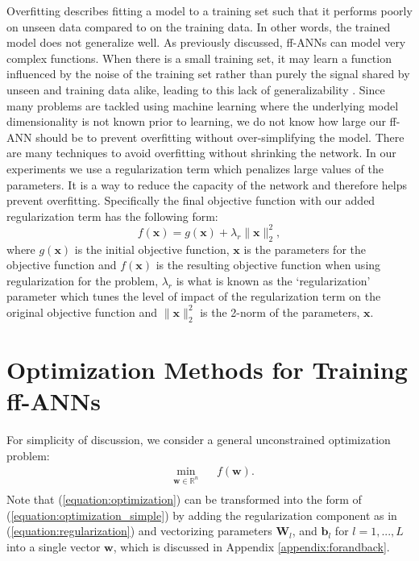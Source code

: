 \documentclass[letterpaper,12pt,titlepage,oneside,final]{book}
\begin{document}
	Overfitting describes fitting a model to a training set such that it performs poorly on unseen data compared to on the training data. In other words, the trained model does not generalize well. As previously discussed, ff-ANNs can model very complex functions. When there is a small training set, it may learn a function influenced by the noise of the training set rather than purely the signal shared by unseen and training data alike, leading to this lack of generalizability \cite{dropout}. Since many problems are tackled using machine learning where the underlying model dimensionality is not known prior to learning, we do not know how large our ff-ANN should be to prevent overfitting without over-simplifying the model. There are many techniques to avoid overfitting without shrinking the network. In our experiments we use a regularization term which penalizes large values of the parameters. It is a way to reduce the capacity of the network and therefore helps prevent overfitting. Specifically the final objective function with our added regularization term has the following form:
	\begin{equation}
	f(\mathbf{x}) = g(\mathbf{x}) + \lambda_{r}\|\mathbf{x}\|_{2}^{2},
	\label{equation:regularization}
	\end{equation}
	where $g(\mathbf{x})$ is the initial objective function, $\mathbf{x}$ is the parameters for the objective function and $f(\mathbf{x})$ is the resulting objective function when using regularization for the problem, $\lambda_{r}$ is what is known as the `regularization' parameter which tunes the level of impact of the regularization term on the original objective function and $\|\mathbf{x}\|_{2}^{2}$ is the 2-norm of the parameters, $\mathbf{x}$.
	
	\section{Optimization Methods for Training ff-ANNs}
	
	For simplicity of discussion, we consider a general unconstrained optimization problem:
	\begin{equation}
	\begin{aligned}
	& \underset{\mathbf{w}\in \mathbb{R}^{n}}{\text{min}}
	& & f(\mathbf{w}).\\
	\end{aligned}
	\label{equation:optimization_simple}
	\end{equation}
	Note that (\ref{equation:optimization}) can be transformed into the form of (\ref{equation:optimization_simple}) by adding the regularization component as in (\ref{equation:regularization}) and vectorizing parameters $\mathbf{W}_{l}$, and $\mathbf{b}_{l}$ for $l = 1,...,L$ into a single vector $\mathbf{w}$, which is discussed in Appendix \ref{appendix:forandback}.
	
\end{document}
